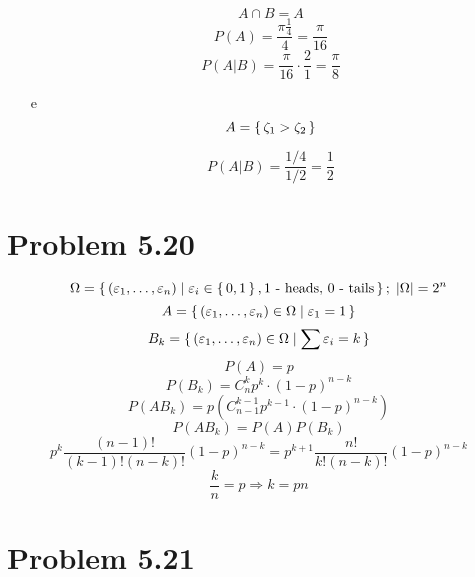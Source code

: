 \documentclass[12pt,letterpaper]{article}
\begin{document}
\begin{itemize}
        \[ A \cap B = A \]
        \[ P(A) = \frac{\pi \frac{1}{4}}{4} = \frac{\pi}{16} \]
        \[ P(A|B) = \frac{\pi}{16} \cdot \frac{2}{1} = \frac{\pi}{8} \]

    \item[e]
        \[ A = \set{ \zeta_1 > \zeta_2 } \]

        \begin{center}
        \end{center}
        \[ P(A|B) = \frac{1/4}{1/2} = \frac{1}{2} \]

\end{itemize}


\section*{Problem 5.20}

\[ \Omega = \set{ (\varepsilon_1, \dots, \varepsilon_n) \mid \varepsilon_i \in \set{0,1}, \text{1 -
heads, 0 - tails} }; \; |\Omega| = 2^n \]
\[ A = \set{ (\varepsilon_1, \dots, \varepsilon_n) \in \Omega \mid \varepsilon_1 = 1 } \]
\[ B_k = \set{  (\varepsilon_1, \dots, \varepsilon_n) \in \Omega \mid \sum \varepsilon_i = k } \]
\[ P(A) = p \]
\[ P(B_k) = C_n^k p^k \cdot (1 - p)^{n-k} \]
\[ P(A B_k) = p (C_{n-1}^{k-1} p^{k-1} \cdot (1 - p)^{n-k}) \]
\[ P(A B_k) = P(A)P(B_k) \]
\[ p^k \frac{(n-1)!}{(k-1)! (n-k)!} (1-p)^{n-k} = p^{k+1} \frac{n!}{k! (n-k)!} (1-p)^{n-k} \]
\[ \frac{k}{n} = p \Rightarrow k = pn \]


\section*{Problem 5.21}
\end{document}

